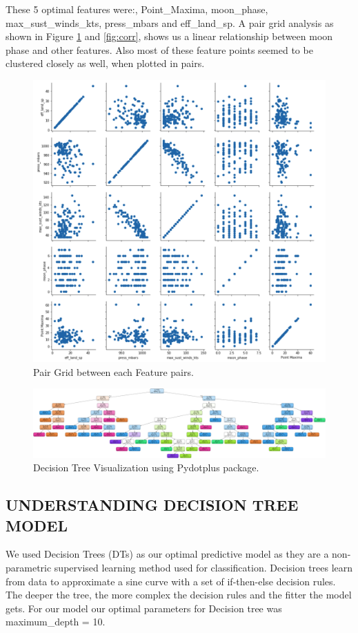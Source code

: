 \documentclass[letterpaper, 10 pt, conference]{ieeeconf}  %
\begin{document}
These 5 optimal features were:, Point\_Maxima, moon\_phase, max\_sust\_winds\_kts, press\_mbars and eff\_land\_sp. A pair grid analysis as shown in Figure \ref{fig:pairgrid} and \ref{fig:corr}, shows  us a linear relationship between moon phase and other features. Also most of these feature points seemed to be clustered closely as well, when plotted in pairs.

\begin{figure}[h!]
  \centering
  \includegraphics[width=0.7\columnwidth]{pair_grid.png}
  \caption{Pair Grid between each Feature pairs.}
  \label{fig:pairgrid}
\end{figure}

\begin{figure}[h!]
  \includegraphics[width=\linewidth]{dtree.png}
  \caption{Decision Tree Visualization using Pydotplus package.}
  \label{fig:dtree}
\end{figure}

\subsection{UNDERSTANDING DECISION TREE MODEL}
We used Decision Trees (DTs) as our optimal  predictive model as they are a non-parametric supervised learning method used for classification. Decision trees learn from data to approximate a sine curve with a set of if-then-else decision rules. The deeper the tree, the more complex the decision rules and the fitter the model gets. For  our model our optimal parameters for Decision tree was maximum\_depth = 10.
\end{document}

